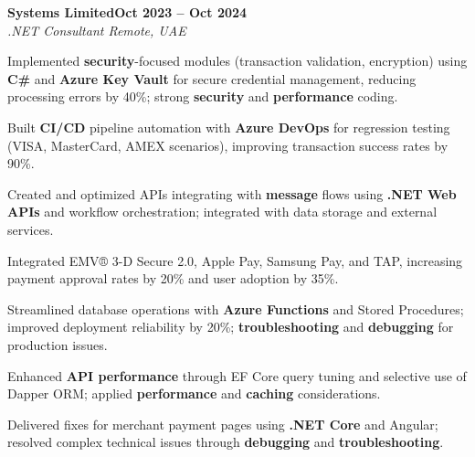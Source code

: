 \documentclass[letterpaper,10pt]{article}
\newcommand{\headingBf}[2]{
  \hspace{10pt}\textbf{#1}\hfill\textbf{#2}\\
}
\newcommand{\headingIt}[2]{
  \hspace{10pt}\textit{#1}\hfill\textit{#2}\\
}
\newenvironment{resume_list}{
  \vspace{-7pt}
  \begin{itemize}[itemsep=-2px, parsep=1pt, leftmargin=30pt]
}{
  \end{itemize}
}
\begin{document}
\headingBf{Systems Limited}{Oct 2023 -- Oct 2024}
\headingIt{.NET Consultant \hfill Remote, UAE}{}
\begin{resume_list}
    \item Implemented \textbf{security}-focused modules (transaction validation, encryption) using \textbf{C\#} and \textbf{Azure Key Vault} for secure credential management, reducing processing errors by 40\%; strong \textbf{security} and \textbf{performance} coding.
    \item Built \textbf{CI/CD} pipeline automation with \textbf{Azure DevOps} for regression testing (VISA, MasterCard, AMEX scenarios), improving transaction success rates by 90\%.
    \item Created and optimized APIs integrating with \textbf{message} flows using \textbf{.NET Web APIs} and workflow orchestration; integrated with data storage and external services.
    \item Integrated EMV® 3-D Secure 2.0, Apple Pay, Samsung Pay, and TAP, increasing payment approval rates by 20\% and user adoption by 35\%.
    \item Streamlined database operations with \textbf{Azure Functions} and Stored Procedures; improved deployment reliability by 20\%; \textbf{troubleshooting} and \textbf{debugging} for production issues.
    \item Enhanced \textbf{API performance} through EF Core query tuning and selective use of Dapper ORM; applied \textbf{performance} and \textbf{caching} considerations.
    \item Delivered fixes for merchant payment pages using \textbf{.NET Core} and Angular; resolved complex technical issues through \textbf{debugging} and \textbf{troubleshooting}.
\end{resume_list}
\end{document}
